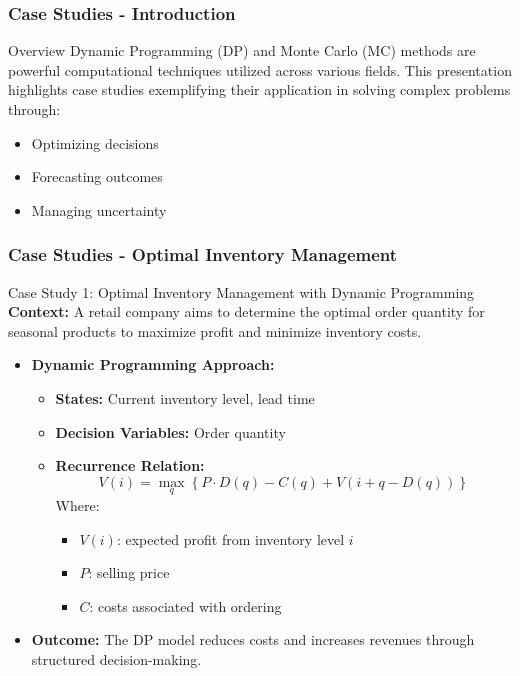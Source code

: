 \documentclass[aspectratio=169]{beamer}
\begin{document}
\begin{frame}[fragile]
    \frametitle{Case Studies - Introduction}
    \begin{block}{Overview}
        Dynamic Programming (DP) and Monte Carlo (MC) methods are powerful computational techniques utilized across various fields. 
        This presentation highlights case studies exemplifying their application in solving complex problems through:
    \end{block}
    \begin{itemize}
        \item Optimizing decisions
        \item Forecasting outcomes
        \item Managing uncertainty
    \end{itemize}
\end{frame}

\begin{frame}[fragile]
    \frametitle{Case Studies - Optimal Inventory Management}
    \begin{block}{Case Study 1: Optimal Inventory Management with Dynamic Programming}
        \textbf{Context:} A retail company aims to determine the optimal order quantity for seasonal products to maximize profit and minimize inventory costs.
    \end{block}
    
    \begin{itemize}
        \item \textbf{Dynamic Programming Approach:}
        \begin{itemize}
            \item \textbf{States:} Current inventory level, lead time
            \item \textbf{Decision Variables:} Order quantity
            \item \textbf{Recurrence Relation:} 
            \begin{equation}
                V(i) = \max_{q} \left\{ P \cdot D(q) - C(q) + V(i + q - D(q)) \right\}
            \end{equation}
            Where: 
            \begin{itemize}
                \item \( V(i) \): expected profit from inventory level \( i \)
                \item \( P \): selling price
                \item \( C \): costs associated with ordering
            \end{itemize}
        \end{itemize}
        \item \textbf{Outcome:} The DP model reduces costs and increases revenues through structured decision-making.
    \end{itemize}
\end{frame}
\end{document}
